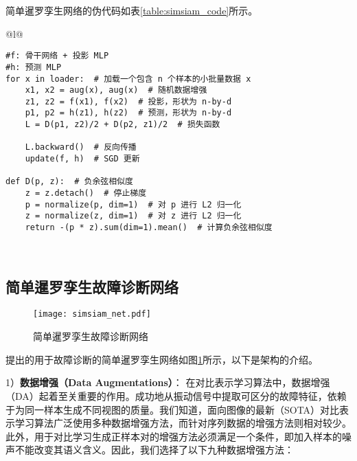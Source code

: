 \documentclass[master]{thesis-uestc}
\begin{document}
简单暹罗孪生网络的伪代码如表\ref{table:simsiam_code}所示。

\begin{table}
    \caption{简单暹罗孪生网络的伪代码，用Pytorch描述}
    \begin{tabular}{@{}l@{}} %
    \toprule
     \\ %
    \midrule
    \begin{lstlisting}[basicstyle=\ttfamily,frame=none]
#f: 骨干网络 + 投影 MLP
#h: 预测 MLP
for x in loader:  # 加载一个包含 n 个样本的小批量数据 x
    x1, x2 = aug(x), aug(x)  # 随机数据增强
    z1, z2 = f(x1), f(x2)  # 投影，形状为 n-by-d
    p1, p2 = h(z1), h(z2)  # 预测，形状为 n-by-d
    L = D(p1, z2)/2 + D(p2, z1)/2  # 损失函数

    L.backward()  # 反向传播
    update(f, h)  # SGD 更新

def D(p, z):  # 负余弦相似度
    z = z.detach()  # 停止梯度
    p = normalize(p, dim=1)  # 对 p 进行 L2 归一化
    z = normalize(z, dim=1)  # 对 z 进行 L2 归一化
    return -(p * z).sum(dim=1).mean()  # 计算负余弦相似度
    \end{lstlisting} \\
    \bottomrule
    \end{tabular}
    \label{table:simsiam_code}
\end{table}
\subsection{简单暹罗孪生故障诊断网络}
\begin{figure}[h]
    \centering
    \texttt{[image: simsiam\_net.pdf]}
    \caption{简单暹罗孪生故障诊断网络}
    \label{simsiam_net}
\end{figure}
提出的用于故障诊断的简单暹罗孪生网络如图\ref{simsiam_net}所示，以下是架构的介绍。

1）\textbf{数据增强（Data Augmentations）}：
在对比表示学习算法中，数据增强（DA）起着至关重要的作用。成功地从振动信号中提取可区分的故障特征，依赖于为同一样本生成不同视图的质量。我们知道，面向图像的最新（SOTA）对比表示学习算法广泛使用多种数据增强方法，而针对序列数据的增强方法则相对较少。
此外，用于对比学习生成正样本对的增强方法必须满足一个条件，即加入样本的噪声不能改变其语义含义。因此，我们选择了以下九种数据增强方法：
\end{document}
